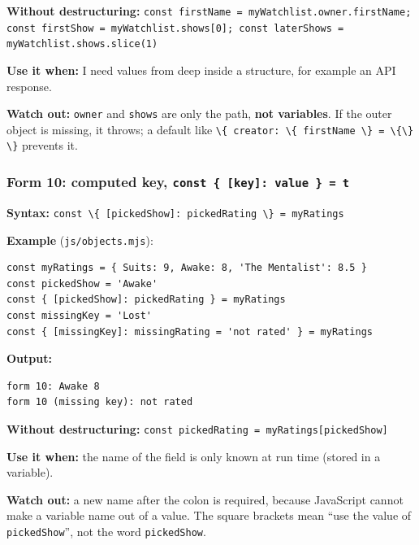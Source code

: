 \documentclass[
  10pt,
]{article}
\newcommand{\passthrough}[1]{#1}
\begin{document}
\textbf{Without destructuring:}
\passthrough{\lstinline!const firstName = myWatchlist.owner.firstName; const firstShow = myWatchlist.shows[0]; const laterShows = myWatchlist.shows.slice(1)!}

\textbf{Use it when:} I need values from deep inside a structure, for
example an API response.

\textbf{Watch out:} \passthrough{\lstinline!owner!} and
\passthrough{\lstinline!shows!} are only the path, \textbf{not
variables}. If the outer object is missing, it throws; a default like
\passthrough{\lstinline!\{ creator: \{ firstName \} = \{\} \}!} prevents
it.

\hypertarget{form-10-computed-key-const-key-value-t}{%
\subsubsection{\texorpdfstring{Form 10: computed key,
\texttt{const\ \{\ {[}key{]}:\ value\ \}\ =\ t}}{Form 10: computed key, const \{ {[}key{]}: value \} = t}}\label{form-10-computed-key-const-key-value-t}}

\textbf{Syntax:}
\passthrough{\lstinline!const \{ [pickedShow]: pickedRating \} = myRatings!}

\textbf{Example} (\passthrough{\lstinline!js/objects.mjs!}):

\begin{lstlisting}
const myRatings = { Suits: 9, Awake: 8, 'The Mentalist': 8.5 }
const pickedShow = 'Awake'
const { [pickedShow]: pickedRating } = myRatings
const missingKey = 'Lost'
const { [missingKey]: missingRating = 'not rated' } = myRatings
\end{lstlisting}

\textbf{Output:}

\begin{lstlisting}
form 10: Awake 8
form 10 (missing key): not rated
\end{lstlisting}

\textbf{Without destructuring:}
\passthrough{\lstinline!const pickedRating = myRatings[pickedShow]!}

\textbf{Use it when:} the name of the field is only known at run time
(stored in a variable).

\textbf{Watch out:} a new name after the colon is required, because
JavaScript cannot make a variable name out of a value. The square
brackets mean ``use the value of \passthrough{\lstinline!pickedShow!}'',
not the word \passthrough{\lstinline!pickedShow!}.
\end{document}
